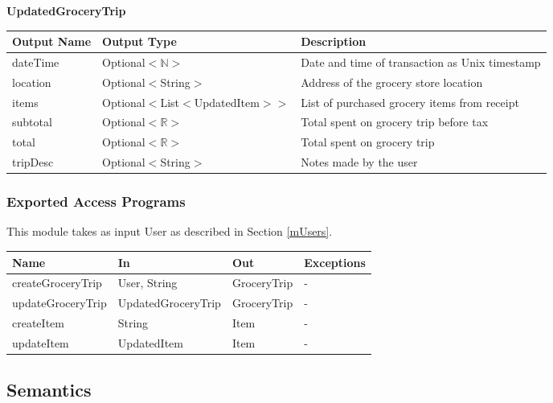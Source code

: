 \documentclass[12pt, titlepage]{article}
\begin{document}
\textbf{UpdatedGroceryTrip}

\begin{table}[H]
  \begin{tabular}{|p{}|p{}|p{}|}
    \hline
    \textbf{Output Name} & \textbf{Output Type} & \textbf{Description} \\
    \hline
    dateTime & Optional$<\mathbb{N}>$ & Date and time of transaction as Unix timestamp \\
    \hline
    location & Optional$<$String$>$ & Address of the grocery store location \\
    \hline
    items & Optional$<$List$<$UpdatedItem$>$$>$ & List of purchased grocery items from receipt \\
    \hline
    subtotal & Optional$<\mathbb{R}>$ & Total spent on grocery trip before tax \\
    \hline
    total & Optional$<\mathbb{R}>$ & Total spent on grocery trip \\
    \hline
    tripDesc & Optional$<$String$>$ & Notes made by the user \\
    \hline
  \end{tabular}
\end{table}

\subsubsection{Exported Access Programs}

This module takes as input User as described in Section \ref{mUsers}.

\begin{center}
  \begin{tabular}{p{5cm} p{4cm} p{3cm} p{4cm}}
  \hline
  \textbf{Name} & \textbf{In} & \textbf{Out} & \textbf{Exceptions} \\
  \hline
  createGroceryTrip & User, String & GroceryTrip & -\\
  updateGroceryTrip & UpdatedGroceryTrip & GroceryTrip & -\\
  createItem & String & Item & -\\
  updateItem & UpdatedItem & Item & -\\
  \hline
  \end{tabular}
\end{center}

\subsection{Semantics}
\end{document}
